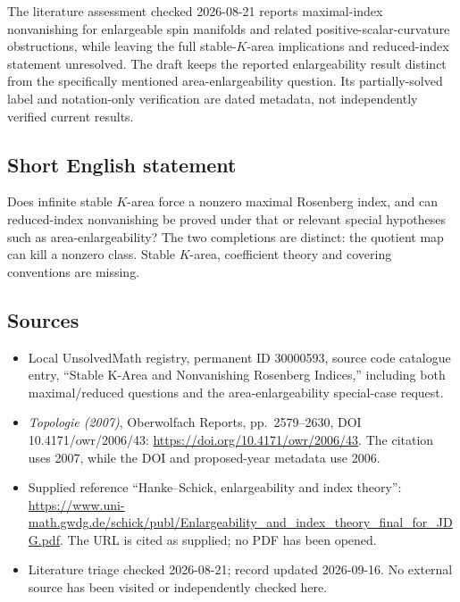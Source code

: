 \documentclass[11pt]{article}
\begin{document}
The literature assessment checked 2026-08-21 reports maximal-index nonvanishing for enlargeable spin manifolds and related positive-scalar-curvature obstructions, while leaving the full stable-\(K\)-area implications and reduced-index statement unresolved. The draft keeps the reported enlargeability result distinct from the specifically mentioned area-enlargeability question. Its partially-solved label and notation-only verification are dated metadata, not independently verified current results.
\subsection{Short English statement}
Does infinite stable \(K\)-area force a nonzero maximal Rosenberg index, and can reduced-index nonvanishing be proved under that or relevant special hypotheses such as area-enlargeability? The two completions are distinct: the quotient map can kill a nonzero class. Stable \(K\)-area, coefficient theory and covering conventions are missing.
\subsection{Sources}
\begin{itemize}
\item Local UnsolvedMath registry, permanent ID 30000593, source code catalogue entry, ``Stable K-Area and Nonvanishing Rosenberg Indices,'' including both maximal/reduced questions and the area-enlargeability special-case request.
\item \emph{Topologie (2007)}, Oberwolfach Reports, pp.\ 2579--2630, DOI 10.4171/owr/2006/43: \url{https://doi.org/10.4171/owr/2006/43}. The citation uses 2007, while the DOI and proposed-year metadata use 2006.
\item Supplied reference ``Hanke--Schick, enlargeability and index theory'': \url{https://www.uni-math.gwdg.de/schick/publ/Enlargeability_and_index_theory_final_for_JDG.pdf}. The URL is cited as supplied; no PDF has been opened.
\item Literature triage checked 2026-08-21; record updated 2026-09-16. No external source has been visited or independently checked here.
\end{itemize}
\end{document}
